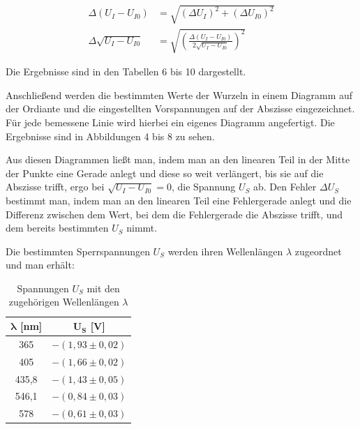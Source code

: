 \documentclass{article}
\begin{document}
\begin{equation}
    \begin{split}
        \Delta (U_I - U_{I0}) &= \sqrt{(\Delta U_I)^2 + (\Delta U_{I0})^2}\\
        \Delta \sqrt{U_I - U_{I0}} &= \sqrt{\left( \frac{\Delta (U_I - U_{I0})}{2\sqrt{U_I - U_{I0}}} \right)^2}
    \end{split}
\end{equation}

Die Ergebnisse sind in den Tabellen 6 bis 10 dargestellt.

Anschließend werden die bestimmten Werte der Wurzeln in einem Diagramm auf der Ordiante und die eingestellten Vorspannungen auf der Abszisse eingezeichnet. Für jede bemessene Linie wird hierbei ein eigenes Diagramm angefertigt. Die Ergebnisse sind in Abbildungen 4 bis 8 zu sehen.

Aus diesen Diagrammen ließt man, indem man an den linearen Teil in der Mitte der Punkte eine Gerade anlegt und diese so weit verlängert, bis sie auf die Abszisse trifft, ergo bei $\sqrt{U_I - U_{I0}} = 0$, die Spannung $U_S$ ab. Den Fehler $\Delta U_S$ bestimmt man, indem man an den linearen Teil eine Fehlergerade anlegt und die Differenz zwischen dem Wert, bei dem die Fehlergerade die Abszisse trifft, und dem bereits bestimmten $U_S$ nimmt.

Die bestimmten Sperrspannungen $U_S$ werden ihren Wellenlängen $\lambda$ zugeordnet und man erhält:

\addtocounter{table}{5}

\begin{table}[h!]
    \centering
    \begin{tabular}{c|c}
    $\bm{\lambda}$ [nm] & $\bm{U_S}$ [V] \\ \hline
    365 & $-(1,93 \pm 0,02)$ \\
    405 & $-(1,66 \pm 0,02)$ \\
    435,8 & $-(1,43 \pm 0,05)$ \\
    546,1 & $-(0,84 \pm 0,03)$ \\
    578 & $-(0,61 \pm 0,03)$ \\
    \end{tabular}
    \caption{Spannungen $U_S$ mit den zugehörigen Wellenlängen $\lambda$}
\end{table}
\end{document}
